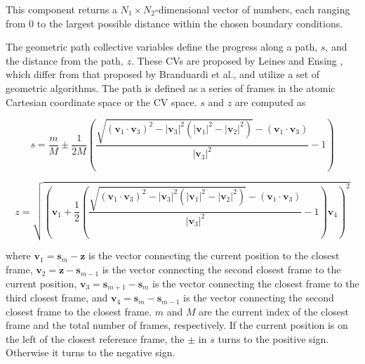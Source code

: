 \begin{cvcoptions}
\item %
\item %
\item %
\end{cvcoptions}
This component returns a $N_{\mathrm{1}}\times{}N_{\mathrm{2}}$-dimensional vector of numbers, each ranging from $0$ to the largest possible distance within the chosen boundary conditions.



The geometric path collective variables define the progress along a path, $s$, and the distance from the path, $z$. These CVs are proposed by Leines and Ensing\cite{Leines2012} , which differ from that\cite{Branduardi2007} proposed by Branduardi et al., and utilize a set of geometric algorithms. The path is defined as a series of frames in the atomic Cartesian coordinate space or the CV space. $s$ and $z$ are computed as

\begin{equation}
s = \frac{m}{M} \pm \frac{1}{2M} \left( \frac{\sqrt{(\mathbf{v}_1 \cdot \mathbf{v}_3)^2-|\mathbf{v}_3|^2 (|\mathbf{v}_1|^2 - |\mathbf{v}_2|^2)}-(\mathbf{v}_1 \cdot \mathbf{v}_3)}{|\mathbf{v}_3|^2} -1 \right)
\end{equation}

\begin{equation}
z = \sqrt{\left(\mathbf{v}_1 + \frac{1}{2}\left(\frac{\sqrt{(\mathbf{v}_1 \cdot \mathbf{v}_3)^2-|\mathbf{v}_3|^2 (|\mathbf{v}_1|^2 - |\mathbf{v}_2|^2)}-(\mathbf{v}_1 \cdot \mathbf{v}_3)}{|\mathbf{v}_3|^2} -1 \right)\mathbf{v}_4 \right)^2}
\end{equation}

where $\mathbf{v}_1 = \mathbf{s}_{m} - \mathbf{z} $ is the vector connecting the current position to the closest frame, $\mathbf{v}_2 = \mathbf{z} - \mathbf{s}_{m-1}$ is the vector connecting the second closest frame to the current position, $\mathbf{v}_3 = \mathbf{s}_{m+1} - \mathbf{s}_{m}$ is the vector connecting the closest frame to the third closest frame, and $\mathbf{v}_4 = \mathbf{s}_m - \mathbf{s}_{m-1}$ is the vector connecting the second closest frame to the closest frame. $m$ and $M$ are the current index of the closest frame and the total number of frames, respectively. If the current position is on the left of the closest reference frame, the $\pm$ in $s$ turns to the positive sign. Otherwise it turns to the negative sign.

